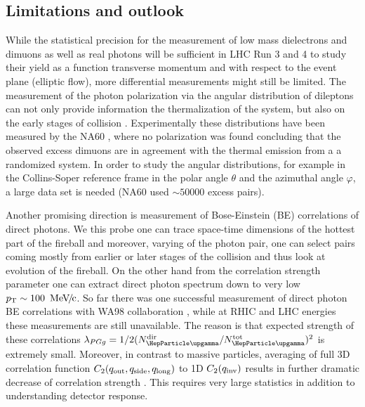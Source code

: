 \documentclass[../report.tex]{subfiles}
\begin{document}

\subsection{Limitations and outlook}

While the statistical precision for the measurement of low mass dielectrons and dimuons as well as real photons will be sufficient in LHC Run 3 and 4 to study their yield as a function transverse momentum and with respect to the event plane (elliptic flow), more differential measurements might still be limited. 
The measurement of the photon polarization via the angular distribution of dileptons can not only provide information the thermalization of the system, but also on the early stages of collision \cite{Baym:2017qxy}. Experimentally these distributions have been measured by the NA60 \cite{Arnaldi:2008gp}, where no polarization was found concluding that the observed excess dimuons are in agreement with the thermal emission from a a randomized system. In order to study the angular distributions, for example in the Collins-Soper reference frame \cite{Collins:1977iv,Lam:1978pu,Lam:1980uc} in the polar angle $\theta$ and the azimuthal angle $\varphi$, a large data set is needed (NA60 used $\sim50000$ excess \PGmpGmm pairs).

Another promising direction is measurement of Bose-Einstein (BE) correlations of direct photons. We this probe one can trace space-time dimensions of the hottest part of the fireball and moreover, varying \kT of the photon pair, one can select pairs coming mostly from earlier or later stages of the collision and thus look at evolution of the fireball. On the other hand from the correlation strength parameter one can extract direct photon spectrum down to very low $\pT \sim \unit[100]{\UMeVc}$. So far there was one successful measurement of direct photon BE correlations with WA98 collaboration \cite{Aggarwal:2003zy}, while at RHIC and LHC energies these measurements are still unavailable. The reason is that expected strength of these correlations $\lambda_{PGg}= 1/2(N_{\PGg}^{\rm dir}/N_{\PGg}^{\rm tot})^2$ is extremely small. Moreover, in contrast to massive particles, averaging of full 3D correlation function $C_2(q_{\rm out},q_{\rm side},q_{\rm long})$ to 1D $C_2(q_{\rm inv})$ results in further dramatic decrease of correlation strength \cite{Aggarwal:2003zy}. This requires very large statistics in addition to understanding detector response. 
\end{document}
